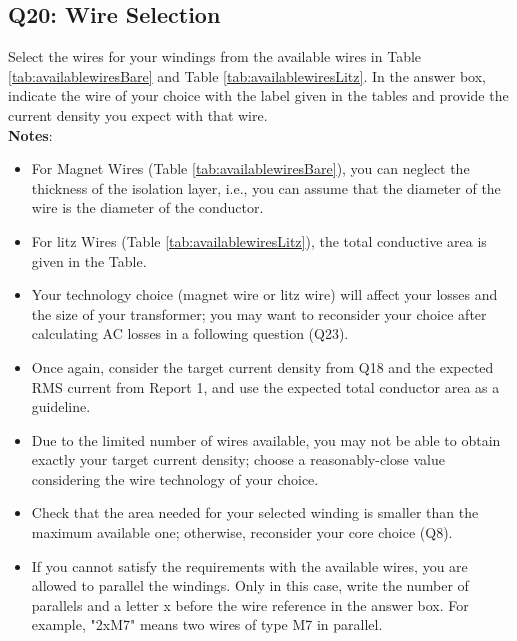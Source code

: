 \documentclass{PELsmallreport}
\begin{document}
 \quad {} \quad {} \hfill{}




\subsection{Q20: Wire Selection} 
Select the wires for your windings from the available wires in Table \ref{tab:availablewiresBare} and Table \ref{tab:availablewiresLitz}. 
In the answer box, indicate the wire of your choice with the label given in the tables and provide the current density you expect with that wire. 
\\

\textbf{Notes}:
\begin{itemize}
    \item For Magnet Wires (Table \ref{tab:availablewiresBare}), you can neglect the thickness of the isolation layer, i.e., you can assume that the diameter of the wire is the diameter of the conductor. 
    \item For litz Wires (Table \ref{tab:availablewiresLitz}), the total conductive area is given in the Table. 
    \item Your technology choice (magnet wire or litz wire) will affect your losses and the size of your transformer; you may want to reconsider your choice after calculating AC losses in a following question (Q23).  
    \item Once again, consider the target current density from Q18 and the expected RMS current from Report 1, and use the expected total conductor area as a guideline. 
    \item Due to the limited number of wires available, you may not be able to obtain exactly your target current density; choose a reasonably-close value considering the wire technology of your choice. 
    \item Check that the area needed for your selected winding is smaller than the maximum available one; otherwise, reconsider your core choice (Q8). 
    \item If you cannot satisfy the requirements with the available wires, you are allowed to parallel the windings. 
    Only in this case, write the number of parallels and a letter x before the wire reference in the answer box. 
    For example, "2xM7" means two wires of type M7 in parallel. 
\end{itemize}
\end{document}
